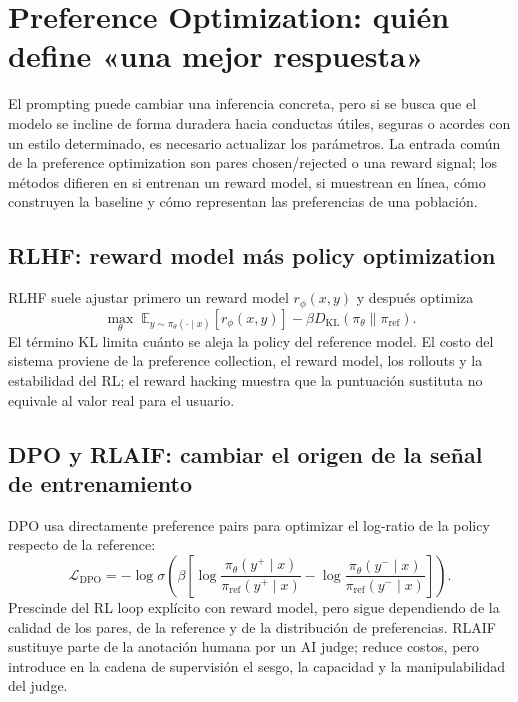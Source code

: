 \section{Preference Optimization: quién define «una mejor respuesta»}

El prompting puede cambiar una inferencia concreta, pero si se busca que el modelo se incline de forma duradera hacia conductas útiles, seguras o acordes con un estilo determinado, es necesario actualizar los parámetros. La entrada común de la preference optimization son pares chosen/rejected o una reward signal; los métodos difieren en si entrenan un reward model, si muestrean en línea, cómo construyen la baseline y cómo representan las preferencias de una población.

\subsection{RLHF: reward model más policy optimization}

RLHF suele ajustar primero un reward model $r_{\phi}(x,y)$ y después optimiza
\[
\max_{\theta}\;\mathbb{E}_{y\sim\pi_{\theta}(\cdot\mid x)}[r_{\phi}(x,y)]
-\beta D_{\mathrm{KL}}(\pi_{\theta}\|\pi_{\mathrm{ref}}).
\]
El término KL limita cuánto se aleja la policy del reference model. El costo del sistema proviene de la preference collection, el reward model, los rollouts y la estabilidad del RL; el reward hacking muestra que la puntuación sustituta no equivale al valor real para el usuario.




\subsection{DPO y RLAIF: cambiar el origen de la señal de entrenamiento}

DPO usa directamente preference pairs para optimizar el log-ratio de la policy respecto de la reference:
\[
\mathcal{L}_{\mathrm{DPO}}=-\log\sigma\!\left(\beta\left[
\log\frac{\pi_{\theta}(y^+\mid x)}{\pi_{\mathrm{ref}}(y^+\mid x)}-
\log\frac{\pi_{\theta}(y^-\mid x)}{\pi_{\mathrm{ref}}(y^-\mid x)}
\right]\right).
\]
Prescinde del RL loop explícito con reward model, pero sigue dependiendo de la calidad de los pares, de la reference y de la distribución de preferencias. RLAIF sustituye parte de la anotación humana por un AI judge; reduce costos, pero introduce en la cadena de supervisión el sesgo, la capacidad y la manipulabilidad del judge.



